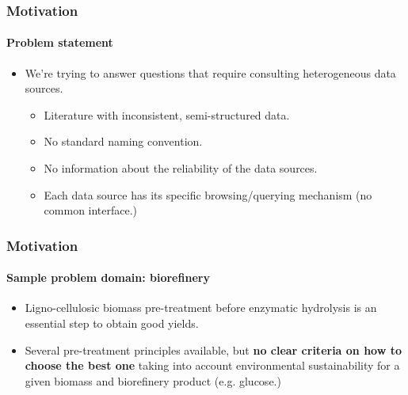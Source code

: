 \documentclass{beamer}
\begin{document}
\begin{frame}
  \frametitle{Motivation}
  \framesubtitle{Problem statement}

  \pause

  \begin{itemize}
    \item We're trying to answer questions that require consulting
      heterogeneous data sources.

    \pause

    \begin{itemize}
      \item Literature with inconsistent, semi-structured data.

      \pause

      \item No standard naming convention.

      \pause

      \item No information about the reliability of the data sources.

      \pause

      \item Each data source has its specific browsing/querying mechanism (no
        common interface.)
    \end{itemize}
  \end{itemize}
\end{frame}

\begin{frame}
  \frametitle{Motivation}
  \framesubtitle{Sample problem domain: \textbf{biorefinery}}

  \begin{itemize}
    \item Ligno-cellulosic biomass pre-treatment before enzymatic hydrolysis is
      an essential step to obtain good yields.

    \pause

    \item Several pre-treatment principles available, but \textbf{no clear
      criteria on how to choose the best one} taking into account environmental
      sustainability for a given biomass and biorefinery product (e.g.
      glucose.)
  \end{itemize}
\end{frame}
\end{document}
